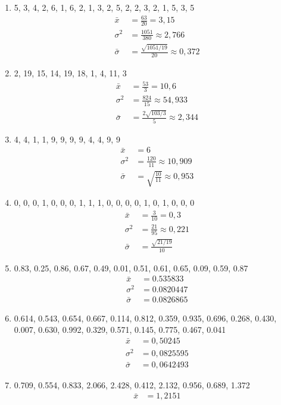 \documentclass[11pt,answers]{exam}
\begin{document}
\begin{questions}
\begin{solution}
\begin{enumerate}
\item {5, 3, 4, 2, 6, 1, 6, 2, 1, 3, 2, 5, 2, 2, 3, 2, 1, 5, 3, 5}
\begin{align*}
\bar x&=\frac{63}{20}=3,15
\\
\sigma^2&=\frac{1051}{380}\approx 2,766
\\
\bar \sigma&=\frac{\sqrt{1051/19}}{20}\approx 0,372
\end{align*}
\item {2, 19, 15, 14, 19, 18, 1, 4, 11, 3}
\begin{align*}
\bar x&=\frac{53}{3}=10,6
\\
\sigma^2&=\frac{824}{15}\approx 54,933
\\
\bar \sigma&=\frac{2\sqrt{103/3}}{5}\approx 2,344
\end{align*}
\item {4, 4, 1, 1, 9, 9, 9, 9, 4, 4, 9, 9}
\begin{align*}
\bar x&=6
\\
\sigma^2&=\frac{120}{11}\approx 10,909
\\
\bar \sigma&=\sqrt{\frac{10}{11}}\approx 0,953
\end{align*}
\item {0, 0, 0, 1, 0, 0, 0, 1, 1, 1, 0, 0, 0, 0, 1, 0, 1, 0, 0, 0}
\begin{align*}
\bar x&=\frac{3}{10}=0,3
\\
\sigma^2&=\frac{21}{95}\approx 0,221
\\
\bar \sigma&=\frac{\sqrt{21/19}}{10}
\end{align*}
\item {0.83, 0.25, 0.86, 0.67, 0.49, 0.01, 0.51, 0.61, 0.65, 0.09, 0.59, 0.87}
\begin{align*}
\bar x&=0.535833
\\
\sigma^2&=0.0820447
\\
\bar \sigma&=0.0826865
\end{align*}
\item {0.614, 0.543, 0.654, 0.667, 0.114, 0.812, 
        0.359, 0.935, 0.696, 0.268, 0.430, 0.007, 0.630, 
        0.992, 0.329, 0.571, 0.145, 0.775, 0.467, 0.041}
\begin{align*}
\bar x&=0,50245
\\
\sigma^2&=0,0825595
\\
\bar \sigma&=0,0642493
\end{align*}
\item {0.709, 0.554, 0.833, 2.066, 2.428, 0.412, 2.132, 0.956, 0.689, 1.372}
\begin{align*}
\bar x&=1,2151

\end{align*}
\end{enumerate}
\end{solution}
\end{questions}
\end{document}
